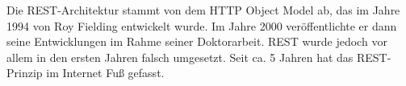 
Die REST-Architektur stammt von dem HTTP Object Model ab, das im Jahre 1994 von Roy Fielding entwickelt wurde. Im Jahre 2000 veröffentlichte er dann seine Entwicklungen im Rahme seiner Doktorarbeit. REST wurde jedoch vor allem in den ersten Jahren falsch umgesetzt. Seit ca. 5 Jahren hat das REST-Prinzip im Internet Fuß gefasst. \cite{WikiREST}